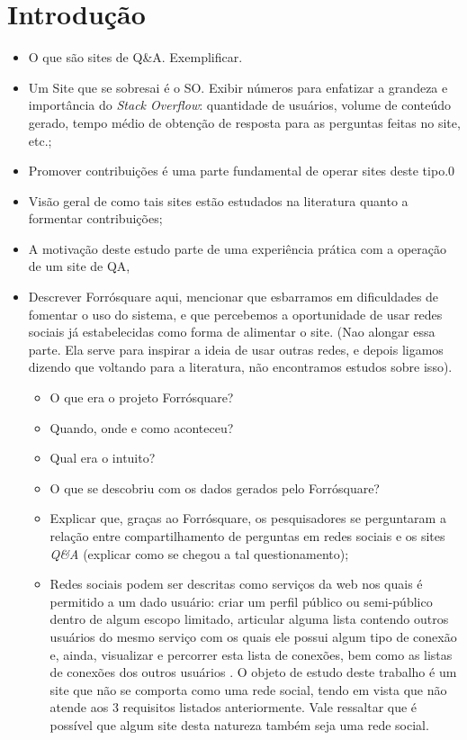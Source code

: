\chapter{Introdução}
    \begin{itemize}
        \item O que são sites de Q\&A. Exemplificar.
        \item Um Site que se sobresai é o SO. Exibir números para enfatizar a grandeza e importância do \textit{Stack Overflow}: quantidade de usuários, volume de conteúdo gerado, tempo médio de obtenção de resposta para as perguntas feitas no site, etc.; 
        \item Promover contribuições é uma parte fundamental de operar sites deste tipo.0
        \item Visão geral de como tais sites estão estudados na literatura quanto a formentar contribuições;
        \item A motivação deste estudo parte de uma experiência prática com a operação de um site de QA,
        \item Descrever Forrósquare aqui, mencionar que esbarramos em dificuldades de fomentar o uso do sistema, e que percebemos a oportunidade de usar redes sociais já estabelecidas como forma de alimentar o site. (Nao alongar essa parte. Ela serve para inspirar a ideia de usar outras redes, e depois ligamos dizendo que voltando para a literatura, não encontramos estudos sobre isso).
            \begin{itemize}
                \item O que era o projeto Forrósquare?
                \item Quando, onde e como aconteceu?
                \item Qual era o intuito?
                \item O que se descobriu com os dados gerados pelo Forrósquare?
                \item Explicar que, graças ao Forrósquare, os pesquisadores se perguntaram a relação entre compartilhamento de perguntas em redes sociais e os sites \textit{Q\&A} (explicar como se chegou a tal questionamento);
                \item Redes sociais podem ser descritas como serviços da web nos quais é permitido a um dado usuário: criar um perfil público ou semi-público dentro de algum escopo limitado, articular alguma lista contendo outros usuários do mesmo serviço com os quais ele possui algum tipo de conexão e, ainda, visualizar e percorrer esta lista de conexões, bem como as listas de conexões dos outros usuários \cite{ellison2007social}. O objeto de estudo deste trabalho é um site \qa que não se comporta como uma rede social, tendo em vista que não atende aos 3 requisitos listados anteriormente. Vale ressaltar que é possível que algum site desta natureza também seja uma rede social. 

\end{itemize}
\end{itemize}
